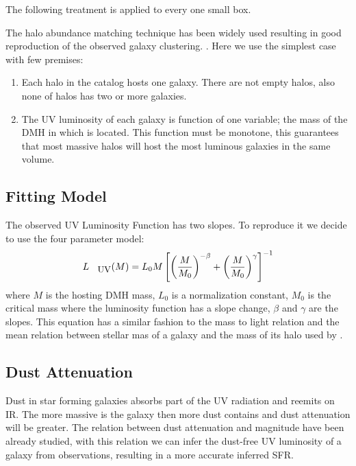 \documentclass{emulateapj}
\begin{document}
The following treatment is applied to every one small box.

The halo abundance matching technique has been widely used \citep{Colin99, 
Kravtsov04} resulting in good reproduction of the observed galaxy clustering. 
\citep{Conroy06, Lee09}. Here we use the simplest case with few premises: 
\begin{enumerate}
 \item Each halo in the catalog hosts one galaxy. There are not empty
halos, also none of halos has two or more galaxies.
 \item The UV luminosity of each galaxy is function of one variable; the mass of
the DMH in which is located. This function must be monotone, this guarantees that most 
massive halos will host the most luminous galaxies in the same volume.
\end{enumerate}

\subsection{Fitting Model}

The observed UV Luminosity Function has two slopes. To reproduce it we decide to use the
 four parameter model:
  \begin{equation}\label{eqn:luminosity}
  L_{\textrm{\small{UV}}} (M) = L_{0} M \left[ \left( \frac{M}{M_0}\right)^{-\beta} 
		   + \left( \frac{M}{M_0}\right)^{\gamma} 
               \right]^{-1}
  \end{equation}
where $M$ is the hosting DMH mass, $L_{0}$ is a normalization constant, $M_0$
is the critical mass where the luminosity function has a slope change, 
$\beta$ and $\gamma$ are the slopes. This equation has a similar fashion to the
mass to light relation \citep{vandenBosch03} and the mean relation between
stellar mas of a galaxy and the mass of its halo used by \citet{Moster10}.


\subsection{Dust Attenuation}
 
Dust in star forming galaxies absorbs part of the UV radiation and reemits on IR. The more 
massive is the galaxy then more dust contains and dust attenuation will be greater. The 
relation between dust attenuation and magnitude have been already studied, with this relation 
we can infer the dust-free UV luminosity of a galaxy from observations, resulting in  a more 
accurate inferred SFR.
\end{document}
